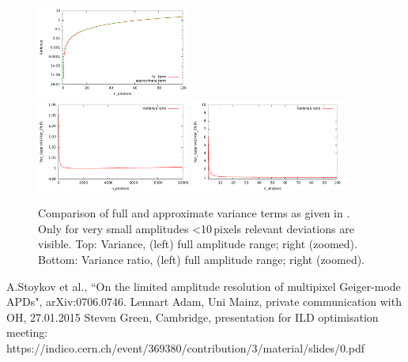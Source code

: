 \documentclass[12pt]{article} %
\begin{document}
\begin{appendices}
\begin{figure}
  \includegraphics[width=0.45\textwidth]{fig/comp_variance/variance_zoom} \\
  \includegraphics[width=0.45\textwidth]{fig/comp_variance/ratio}
  \includegraphics[width=0.45\textwidth]{fig/comp_variance/ratio_zoom}
  \caption{Comparison of full and approximate variance terms as given in \cite{PPD}. Only for very small amplitudes  \textless 10\,pixels relevant deviations are visible.
    Top: Variance, (left) full amplitude range; right (zoomed). 
    Bottom: Variance ratio, (left) full amplitude range; right (zoomed).}
\label{fig:variance}
\end{figure}


\end{appendices}


\begin{thebibliography}{99}
A.Stoykov et al., ``On the limited amplitude resolution of multipixel Geiger-mode APDs", arXiv:0706.0746.
Lennart Adam, Uni Mainz, private communication with OH, 27.01.2015
Steven Green, Cambridge, presentation for ILD optimisation meeting: https://indico.cern.ch/event/369380/contribution/3/material/slides/0.pdf

\end{thebibliography}
\end{document}
